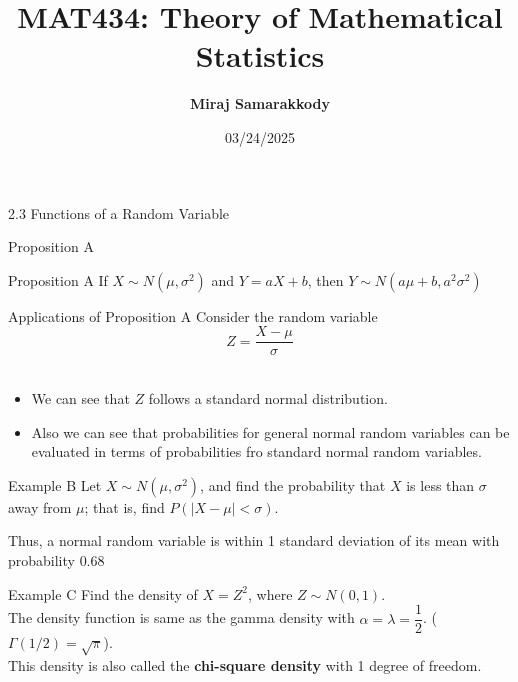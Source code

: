 \documentclass{beamer}
\title{MAT434: Theory of Mathematical Statistics}
\author{\textbf{Miraj Samarakkody}}
\institute{Tougaloo College}
\date{03/24/2025}
\begin{document}
\begin{frame}
    \titlepage
\end{frame}



\begin{frame}{}
    \begin{center}
        \Huge{2.3 Functions of a Random Variable}
    \end{center}

\end{frame}





\begin{frame}{Proposition A}
\begin{block}{Proposition A}    
If \(X \sim N(\mu, \sigma^2)\) and \(Y=aX+b\), then \(Y\sim N(a\mu +b, a^2\sigma^2)\)
\end{block}
\end{frame}

\begin{frame}{Applications of Proposition A}
Consider the random variable \[Z=\dfrac{X-\mu}{\sigma}\]\\ \pause 


\begin{itemize}
    \item We can see that \(Z\) follows a standard normal distribution. \\\pause


    \item Also we can see that probabilities for general normal random variables can be evaluated in terms of probabilities fro standard normal random variables. 
\end{itemize} 
\end{frame}




\begin{frame}{Example B}
Let \(X \sim N (\mu, \sigma^2)\), and find the probability that \(X\) is less than \(\sigma\) away from \(\mu\); that is, find \(P(|X-\mu|< \sigma)\).\\ \pause
\vspace{0.2in}

Thus, a normal random variable is within 1 standard deviation of its mean with probability \(0.68\)
\end{frame}

\begin{frame}{Example C}
    Find the density of \(X=Z^2\), where \(Z \sim N(0,1)\). \\
    \pause
    \vspace{0.2in}
    The density function is same as the gamma density with \(\alpha = \lambda = \dfrac{1}{2}\). (\(\Gamma(1/2)= \sqrt{\pi}\)).\\
    This density is also called the \textbf{chi-square density} with 1 degree of freedom. 
\end{frame}
\end{document}
